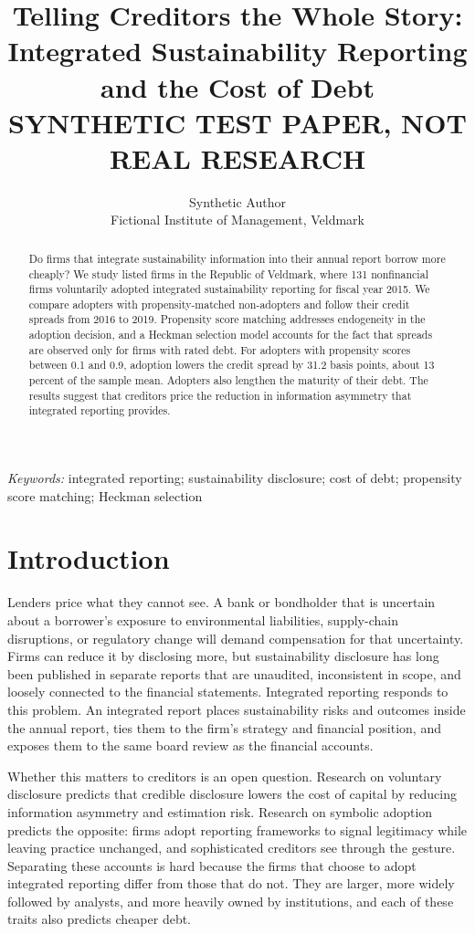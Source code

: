 \documentclass[11pt]{article}
\title{Telling Creditors the Whole Story: Integrated Sustainability Reporting and the Cost of Debt\\[0.6em]
\large\textbf{SYNTHETIC TEST PAPER, NOT REAL RESEARCH}}
\author{Synthetic Author\\Fictional Institute of Management, Veldmark}
\date{}
\begin{document}
\maketitle

\begin{abstract}
\noindent Do firms that integrate sustainability information into their annual report borrow more cheaply? We study listed firms in the Republic of Veldmark, where 131 nonfinancial firms voluntarily adopted integrated sustainability reporting for fiscal year 2015. We compare adopters with propensity-matched non-adopters and follow their credit spreads from 2016 to 2019. Propensity score matching addresses endogeneity in the adoption decision, and a Heckman selection model accounts for the fact that spreads are observed only for firms with rated debt. For adopters with propensity scores between 0.1 and 0.9, adoption lowers the credit spread by 31.2 basis points, about 13 percent of the sample mean. Adopters also lengthen the maturity of their debt. The results suggest that creditors price the reduction in information asymmetry that integrated reporting provides.
\end{abstract}

\noindent\textit{Keywords:} integrated reporting; sustainability disclosure; cost of debt; propensity score matching; Heckman selection

\section{Introduction}

Lenders price what they cannot see. A bank or bondholder that is uncertain about a borrower's exposure to environmental liabilities, supply-chain disruptions, or regulatory change will demand compensation for that uncertainty. Firms can reduce it by disclosing more, but sustainability disclosure has long been published in separate reports that are unaudited, inconsistent in scope, and loosely connected to the financial statements. Integrated reporting responds to this problem. An integrated report places sustainability risks and outcomes inside the annual report, ties them to the firm's strategy and financial position, and exposes them to the same board review as the financial accounts.

Whether this matters to creditors is an open question. Research on voluntary disclosure predicts that credible disclosure lowers the cost of capital by reducing information asymmetry and estimation risk. Research on symbolic adoption predicts the opposite: firms adopt reporting frameworks to signal legitimacy while leaving practice unchanged, and sophisticated creditors see through the gesture. Separating these accounts is hard because the firms that choose to adopt integrated reporting differ from those that do not. They are larger, more widely followed by analysts, and more heavily owned by institutions, and each of these traits also predicts cheaper debt.
\end{document}
